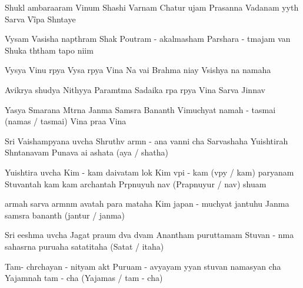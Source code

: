 \documentclass[20pt]{article}
\begin{document}

\SlokaHuge
{Shukl{\A} ambara{\dH}aram Vi{\sh}num} {Shashi Varnam Chatur {\Bh}ujam}
{Prasanna Vadanam {\Dh}y{\A}y{\e}th} {Sarva Vi{\G}{\no}pa Sh{\A}ntaye}

\phantom{\countr}
\SlokaHuge
{Vy{\A}sam Vasish{\T}a napth{\A}ram} {Shak{\teh} Poutram - akalmasham}
{Par{\A}shara - {\A}tmajam van{\de}} {Shuka th{\A}tham tapo ni{\dH}im}

\SlokaHuge
{Vy{\A}s{\A}ya Vi{\sh}nu r{\oo}p{\A}ya} {Vy{\A}sa r{\oo}p{\A}ya Vi{\sh}na{\ve}}
{Na{\mo} vai Brahma ni{\dH}ay{\e}} {V{\aaa}sish{\T}{\A}ya na{\mo} namaha}

\newpage

\SlokaHuge
{Avik{\A}r{\A}ya shud{\dH}{\A}ya} {Nithy{\A}ya Param{\A}tma{\nE}}
{Sadaika r{\oo}pa r{\oo}p{\A}ya} {Vi{\sh}na{\ve} Sarva Ji{\sh}nnav{\e}}

\SlokaHuge
{Yasya Smarana M{\A}tr{\e}na} {Janma Sams{\A}ra Ban{\dH}an{\A}th}
{Vimuchyat{\e} namah - tasmai (namas / tasmai)} {Vi{\sh}na{\ve} pra{\bh}a Vi{\sh}na{\ve}}


\SlokaHeaderHuge
{Sri Vaishamp{\A}yana uv{\A}cha}
{Shruthv{\A} {\Dh}arm{\A}n - a{\she}{\she}na} {{\Pa}van{\A}ni cha Sarvashaha}
{Yu{\dH}ishtirah Sh{\A}ntanavam} {Puna{\re}va \dsh a{\bh}i \dsh a{\bha}shata (a{\bh}ya / {\bha}shatha)}

\newpage

\SlokaHeaderHuge
{Yu{\dH}ishtira uv{\A}cha}
{Kim - {\e}kam daivatam lok{\e}} {Kim v{\A}pi - {\e}kam (v{\A}py{\e} / kam) par{\A}yanam}
{Stuvantah kam kam \dsh archantah} {Pr{\A}pnuyuh \dsh {\ma}nav{\ah} (Prapnuyur / {\ma}nav{\ah}) shu{\bh}am}

\SlokaHuge
{{\Ko} {\Dh}armah sarva {\Dh}arm{\A}n{\aaa}m} {{\bh}avatah para{\mo} mataha}
{Kim japan - muchyat{\e} jantuhu} {Janma sams{\A}ra ban{\dH}an{\A}th (jantur / janma)}

\SlokaHeaderHuge
{Sri {\Bh}eeshma uv{\A}cha}
{Jagat pra{\bh}um d{\e}va d{\e}vam} {Anantham puru{\sh}{\oh}ttamam}
{Stuvan - n{\A}ma sahasr{\e}na} {puru{\sh}aha satat{\oh}{\tH}itaha (Satat{\oh} / {\tH}itaha)}

\newpage

\SlokaHuge
{Tam-{\eva} ch{\aaa}rchayan - nityam} {{\Bh}akt{\ya} Puru{\sh}am - avyayam}
{{\Dh}y{\A}yan stuvan namasyan \dsh cha} {Yajam{\aaa}nah tam - {\eva} cha (Yajam{\an}as / tam - {\eva} cha)}
\end{document}
